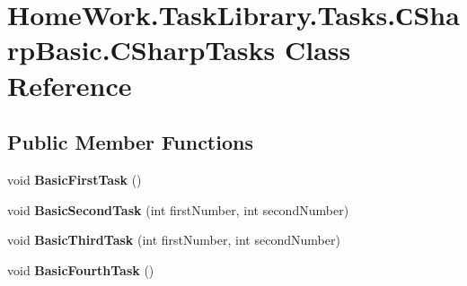 \hypertarget{class_home_work_1_1_task_library_1_1_tasks_1_1_xD0_xA1_sharp_basic_1_1_c_sharp_tasks}{}\section{Home\+Work.\+Task\+Library.\+Tasks.\+С\+Sharp\+Basic.\+C\+Sharp\+Tasks Class Reference}
\label{class_home_work_1_1_task_library_1_1_tasks_1_1_xD0_xA1_sharp_basic_1_1_c_sharp_tasks}
\subsection*{Public Member Functions}
\begin{DoxyCompactItemize}
\item 
\mbox{\label{class_home_work_1_1_task_library_1_1_tasks_1_1_xD0_xA1_sharp_basic_1_1_c_sharp_tasks_aed380899c1c415ac3d5bd00caae47ea7}} 
void {\bfseries Basic\+First\+Task} ()
\item 
\mbox{\label{class_home_work_1_1_task_library_1_1_tasks_1_1_xD0_xA1_sharp_basic_1_1_c_sharp_tasks_a5d89cd57f648e266c3e672abc8635a3d}} 
void {\bfseries Basic\+Second\+Task} (int first\+Number, int second\+Number)
\item 
\mbox{\label{class_home_work_1_1_task_library_1_1_tasks_1_1_xD0_xA1_sharp_basic_1_1_c_sharp_tasks_aa37c4b9344f18ebd3094ed4e83fe205c}} 
void {\bfseries Basic\+Third\+Task} (int first\+Number, int second\+Number)
\item 
\mbox{\label{class_home_work_1_1_task_library_1_1_tasks_1_1_xD0_xA1_sharp_basic_1_1_c_sharp_tasks_ae3737d9e89643087be5910650a1e9787}} 
void {\bfseries Basic\+Fourth\+Task} ()
\item 
\mbox{\label{class_home_work_1_1_task_library_1_1_tasks_1_1_xD0_xA1_sharp_basic_1_1_c_sharp_tasks_aacb07aa97e6d8732c6eee751d473de9b}} 

\end{DoxyCompactItemize}
